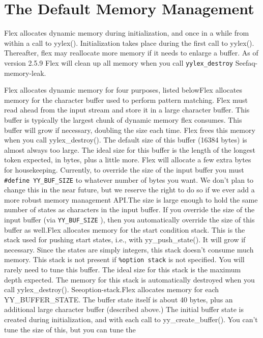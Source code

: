 \documentclass[openany,oneside]{book}
\begin{document}
\section{The Default Memory Management}


Flex allocates dynamic memory during initialization, and once in a while from
within a call to yylex(). Initialization takes place during the first call to
yylex(). Thereafter, flex may reallocate more memory if it needs to enlarge a
buffer. As of version 2.5.9 Flex will clean up all memory when you call \verb`yylex_destroy` Seefaq-memory-leak.

Flex allocates dynamic memory for four purposes, listed belowFlex allocates memory for the character buffer used to perform pattern
matching.  Flex must read ahead from the input stream and store it in a large
character buffer.  This buffer is typically the largest chunk of dynamic memory
flex consumes. This buffer will grow if necessary, doubling the size each time. 
Flex frees this memory when you call yylex\_{}destroy().  The default size of this
buffer (16384 bytes) is almost always too large.  The ideal size for this
buffer is the length of the longest token expected, in bytes, plus a little more.  Flex will allocate a few
extra bytes for housekeeping. Currently, to override the size of the input buffer
you must \verb`#define YY_BUF_SIZE` to whatever number of bytes you want. We don't plan
to change this in the near future, but we reserve the right to do so if we ever add a more robust memory management
API.The size is  large enough to hold the same number of states as characters in the input buffer. If you override the size of the
input buffer (via \verb`YY_BUF_SIZE` ), then you automatically override the size of this buffer as well.Flex allocates memory for the start condition stack. This is the stack used
for pushing start states, i.e., with yy\_{}push\_{}state(). It will grow if
necessary.  Since the states are simply integers, this stack doesn't consume
much memory.  This stack is not present if \verb`%option stack` is not
specified.  You will rarely need to tune this buffer. The ideal size for this
stack is the maximum depth expected.  The memory for this stack is
automatically destroyed when you call yylex\_{}destroy(). Seeoption-stack.Flex allocates memory for each YY\_{}BUFFER\_{}STATE. The buffer state itself
is about 40 bytes, plus an additional large character buffer (described above.) 
The initial buffer state is created during initialization, and with each call
to yy\_{}create\_{}buffer(). You can't tune the size of this, but you can tune the
\end{document}
